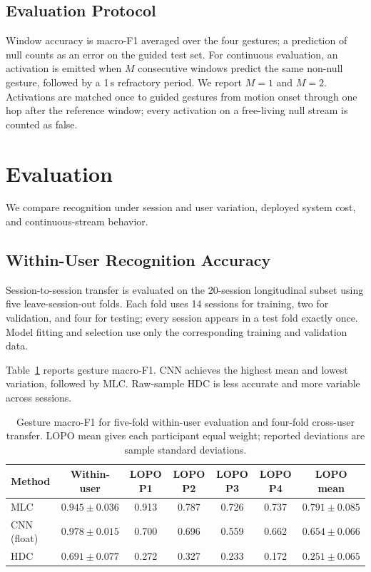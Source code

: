\subsection{Evaluation Protocol}

Window accuracy is macro-F1 averaged over the four gestures; a prediction of
null counts as an error on the guided test set. For continuous evaluation, an
activation is emitted when $M$ consecutive windows predict the same non-null
gesture, followed by a 1\,s refractory period. We report $M=1$ and $M=2$.
Activations are matched once to guided gestures from motion onset through one
hop after the reference window; every activation on a free-living null stream
is counted as false.

\section{Evaluation}

We compare recognition under session and user variation, deployed system cost,
and continuous-stream behavior.

\subsection{Within-User Recognition Accuracy}

Session-to-session transfer is evaluated on the 20-session longitudinal subset
using five leave-session-out folds. Each fold uses 14 sessions for training,
two for validation, and four for testing; every session appears in a test fold
exactly once. Model fitting and selection use only the corresponding training
and validation data.

Table~\ref{tab:recognition} reports gesture macro-F1. CNN achieves the highest
mean and lowest variation, followed by MLC. Raw-sample HDC is less accurate and
more variable across sessions.

\begin{table}[t]
    \centering
    \caption{Gesture macro-F1 for five-fold within-user evaluation and
    four-fold cross-user transfer. LOPO mean gives each participant equal
    weight; reported deviations are sample standard deviations.}
    \label{tab:recognition}
    \small
    \begin{tabular}{lcccccc}
        \toprule
        Method & Within-user & LOPO P1 & LOPO P2 & LOPO P3 & LOPO P4
            & LOPO mean \\
        \midrule
        MLC & $0.945\pm0.036$ & 0.913 & 0.787 & 0.726 & 0.737
            & $0.791\pm0.085$ \\
        CNN (float) & $0.978\pm0.015$ & 0.700 & 0.696 & 0.559 & 0.662
            & $0.654\pm0.066$ \\
        HDC & $0.691\pm0.077$ & 0.272 & 0.327 & 0.233 & 0.172
            & $0.251\pm0.065$ \\
        \bottomrule
    \end{tabular}
\end{table}

